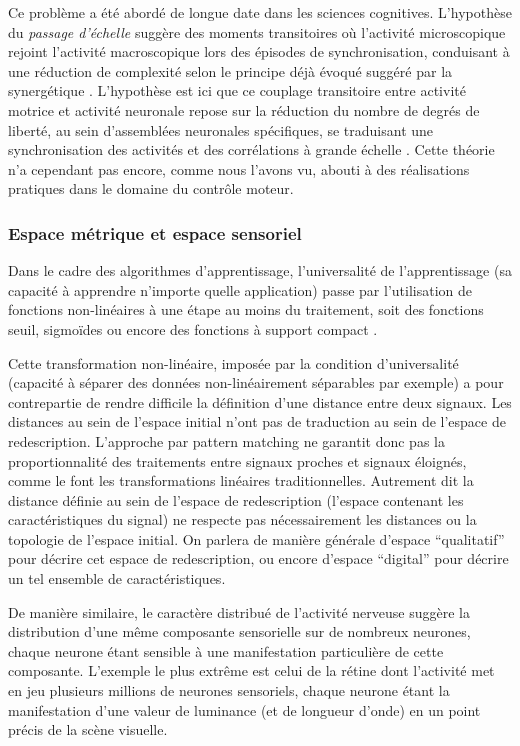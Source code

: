 \documentclass[11pt]{article}
\begin{document}
Ce problème a été abordé de longue date dans les sciences cognitives.
L'hypothèse du \textit{passage d'échelle} suggère des moments transitoires où l'activité microscopique rejoint 
l'activité macroscopique lors des épisodes de synchronisation, conduisant à une réduction de 
complexité selon le principe déjà évoqué suggéré par la synergétique .
L'hypothèse est ici que ce couplage transitoire entre activité motrice et activité neuronale repose sur la réduction du nombre de degrés de liberté, au sein d'assemblées neuronales spécifiques, se traduisant une synchronisation des activités et des corrélations à grande échelle .
Cette théorie n'a cependant pas encore, comme nous l'avons vu, abouti à des réalisations pratiques dans le domaine du contrôle moteur.



	\subsubsection{Espace métrique et espace sensoriel}	


 Dans le cadre des algorithmes d'apprentissage, l'universalité de l'apprentissage (sa capacité à
	apprendre n'importe quelle application) passe par l'utilisation de fonctions non-linéaires 
	à une étape au moins du traitement, soit des fonctions seuil, sigmoïdes ou encore des
	fonctions à support compact . 
	
	Cette transformation non-linéaire, imposée par la condition d'universalité (capacité à séparer des données 
	non-linéairement séparables par exemple) a pour contrepartie de rendre difficile la définition
	d'une distance entre deux signaux. 
	Les distances au sein de l'espace initial n'ont pas de traduction au sein de
	l'espace de redescription.
	L'approche par pattern matching ne garantit donc pas la proportionnalité des traitements entre signaux proches 
	et signaux éloignés, comme le font les transformations linéaires  traditionnelles.
	Autrement dit la distance définie au sein de l'espace de redescription (l'espace contenant les caractéristiques du signal)
	ne respecte pas nécessairement les distances ou la topologie de l'espace initial.
	On parlera de manière générale d'espace ``qualitatif'' pour décrire cet espace de redescription, ou encore d'espace
	``digital'' pour décrire un tel ensemble de caractéristiques.
	
De manière similaire, le caractère distribué de l'activité nerveuse suggère  la distribution d'une même composante sensorielle 
	sur de nombreux neurones, chaque neurone étant sensible à une manifestation particulière
	de cette composante. L'exemple le plus extrême est celui de la rétine dont l'activité met en jeu 
	plusieurs millions de neurones sensoriels, chaque neurone étant la manifestation d'une valeur de luminance
	(et de longueur d'onde) en un point précis de la scène visuelle.
\end{document}

